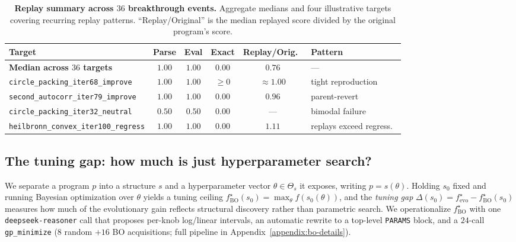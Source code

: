\begin{table}[t]
\centering
\caption{\textbf{Replay summary across $36$ breakthrough events.} Aggregate medians and four illustrative targets covering recurring replay patterns. ``Replay/Original'' is the median replayed score divided by the original program's score.}
\label{tab:replay-summary}
\small
\setlength{\tabcolsep}{4pt}
\renewcommand{\arraystretch}{1.15}
\begin{tabular}{@{}lccccl@{}}
\toprule
Target & Parse & Eval & Exact & Replay/Orig.\ & Pattern \\
\midrule
\textbf{Median across $36$ targets} & $1.00$ & $1.00$ & $0.00$ & $0.76$ & --- \\
\midrule
\texttt{circle\_packing\_iter68\_improve}    & $1.00$ & $1.00$ & $\geq\!0$ & $\approx\!1.00$ & tight reproduction \\
\texttt{second\_autocorr\_iter79\_improve}   & $1.00$ & $1.00$ & $0.00$    & $0.96$          & parent-revert \\
\texttt{circle\_packing\_iter32\_neutral}    & $0.50$ & $0.50$ & $0.00$    & ---             & bimodal failure \\
\texttt{heilbronn\_convex\_iter100\_regress} & $1.00$ & $1.00$ & $0.00$    & $1.11$          & replays exceed regress.\ \\
\bottomrule
\end{tabular}
\end{table}

\subsection{The tuning gap: how much is just hyperparameter search?}
\label{sec:tuning-gap}

\newcommand{\NBOwins}{22}
\newcommand{\NBOnochange}{8}
\newcommand{\NBOregress}{6}

We separate a program $p$ into a structure $s$ and a hyperparameter vector $\theta \in \Theta_s$ it exposes, writing $p = s(\theta)$. Holding $s_0$ fixed and running Bayesian optimization over $\theta$ yields a tuning ceiling $f^{\star}_{\mathrm{BO}}(s_0) = \max_{\theta} f(s_0(\theta))$, and the \emph{tuning gap} $\Delta(s_0) = f^{\star}_{\mathrm{evo}} - f^{\star}_{\mathrm{BO}}(s_0)$ measures how much of the evolutionary gain reflects structural discovery rather than parametric search. We operationalize $f^{\star}_{\mathrm{BO}}$ with one \texttt{deepseek-reasoner} call that proposes per-knob log/linear intervals, an automatic rewrite to a top-level \texttt{PARAMS} block, and a $24$-call \texttt{gp\_minimize} ($8$ random $+ 16$ BO acquisitions; full pipeline in Appendix~\ref{appendix:bo-details}).


